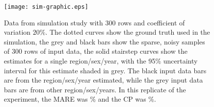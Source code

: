 \begin{figure}
\texttt{[image: sim-graphic.eps]}
\caption{Data from simulation study with $300$ rows and coefficient of
  variation $20\%$.  The dotted curves show the ground truth used in
  the simulation, the grey and black bars show the sparse, noisy
  samples of $300$ rows of input data, the solid stairstep curves show
  the estimates for a single region/sex/year, with the 95\%
  uncertainty interval for this estimate shaded in grey.  The black
  input data bars are from the region/sex/year estimated, while the
  grey input data bars are from other region/sex/years.  In this
  replicate of the experiment, the MARE was \% and the
  CP was \%.}
\label{fig:sim-graphic}
\end{figure}
